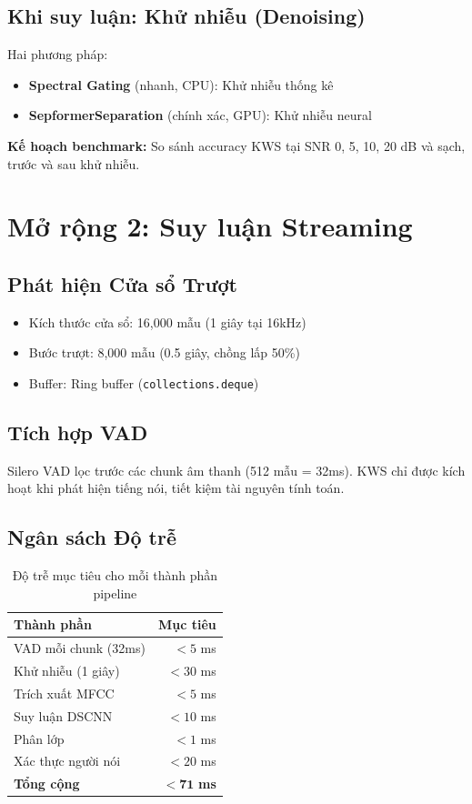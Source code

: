 \documentclass[12pt,a4paper]{report}
\begin{document}
\subsection{Khi suy luận: Khử nhiễu (Denoising)}

Hai phương pháp:
\begin{itemize}
    \item \textbf{Spectral Gating} (nhanh, CPU): Khử nhiễu thống kê
    \item \textbf{SepformerSeparation} (chính xác, GPU): Khử nhiễu neural
\end{itemize}

\textbf{Kế hoạch benchmark:} So sánh accuracy KWS tại SNR 0, 5, 10, 20 dB
và sạch, trước và sau khử nhiễu.


\section{Mở rộng 2: Suy luận Streaming}

\subsection{Phát hiện Cửa sổ Trượt}

\begin{itemize}
    \item Kích thước cửa sổ: 16,000 mẫu (1 giây tại 16kHz)
    \item Bước trượt: 8,000 mẫu (0.5 giây, chồng lấp 50\%)
    \item Buffer: Ring buffer (\texttt{collections.deque})
\end{itemize}

\subsection{Tích hợp VAD}

Silero VAD lọc trước các chunk âm thanh (512 mẫu = 32ms). KWS chỉ được kích
hoạt khi phát hiện tiếng nói, tiết kiệm tài nguyên tính toán.

\subsection{Ngân sách Độ trễ}

\begin{table}[h]
\centering
\caption{Độ trễ mục tiêu cho mỗi thành phần pipeline}
\begin{tabular}{lr}
\toprule
\textbf{Thành phần} & \textbf{Mục tiêu} \\
\midrule
VAD mỗi chunk (32ms) & $< 5$ ms \\
Khử nhiễu (1 giây) & $< 30$ ms \\
Trích xuất MFCC & $< 5$ ms \\
Suy luận DSCNN & $< 10$ ms \\
Phân lớp & $< 1$ ms \\
Xác thực người nói & $< 20$ ms \\
\midrule
\textbf{Tổng cộng} & $\mathbf{< 71}$ \textbf{ms} \\
\bottomrule
\end{tabular}
\end{table}
\end{document}
